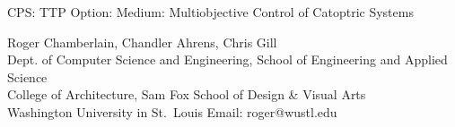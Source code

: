 \documentclass[final,11pt]{article}
\begin{document}
\thispagestyle{empty}
\setcounter{page}{0}

\begin{center}
{\Large CPS: TTP Option: Medium: Multiobjective Control of Catoptric Systems}

\vskip 0.2in
{\sc Roger Chamberlain, Chandler Ahrens, Chris Gill}
\\Dept. of Computer Science and Engineering, School of Engineering and Applied Science\\
College of Architecture, Sam Fox School of Design \& Visual Arts
\\Washington University in St.~Louis
\vskip 0.05in
Email: roger@wustl.edu
\end{center}

\clearpage
\pagestyle{plain}
\setcounter{page}{1}

%
%
%
%
%
%
%
%

%

\clearpage

%

\end{document}
